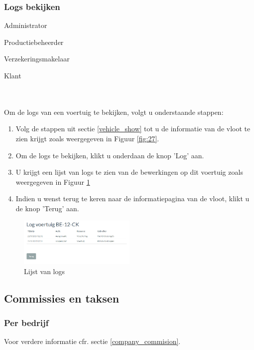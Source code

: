 \documentclass[11pt,openany]{article}
\newcommand{\cmark}{\ding{51}}%
\newcommand{\xmark}{\ding{55}}%
\newcommand{\done}{\rlap{$\square$}{\raisebox{2pt}{\large\hspace{1pt}\cmark}}%
	\hspace{-2.5pt}}
\newcommand{\wontfix}{\rlap{$\square$}{\large\hspace{1pt}\xmark}}
\begin{document}
\subsubsection{Logs bekijken}
\label{vehicle_logs}
\begin{todolist}
	\item[\done] Administrator
	\item[\done] Productiebeheerder
	\item[\done] Verzekeringsmakelaar
	\item[\wontfix] Klant 
\end{todolist}
\\
\\
Om de logs van een voertuig te bekijken, volgt u onderstaande stappen:
\begin{enumerate}
	\item  Volg de stappen uit sectie \ref{vehicle_show} tot u de informatie van de vloot te zien krijgt zoals weergegeven in Figuur \ref{fig:27}.
	\item Om de logs te bekijken, klikt u onderdaan de knop 'Log' aan.
	\item U krijgt een lijst van logs te zien van de bewerkingen op dit voertuig zoals weergegeven in Figuur \ref{fig:31}
	\item Indien u wenst terug te keren naar de informatiepagina van de vloot, klikt u de knop 'Terug' aan.
\end{enumerate}

\begin{figure}
	\centering
	\includegraphics[width=0.5\textwidth]{img/fig31.png}
	\caption{Lijst van logs} 
	\label{fig:31} 
\end{figure}







\newpage
\subsection{Commissies en taksen}
\subsubsection{Per bedrijf}
Voor verdere informatie cfr. sectie \ref{company_commision}.
\end{document}
